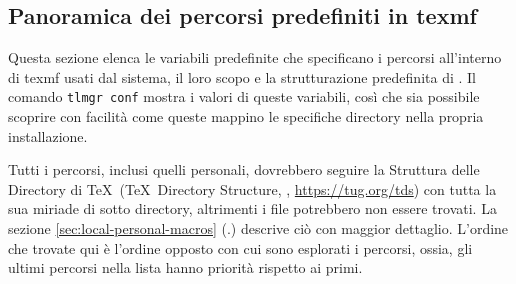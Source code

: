 \documentclass{article}
\begin{document}
\subsection{Panoramica dei percorsi predefiniti in texmf}
\label{sec:texmftrees}

Questa sezione elenca le variabili predefinite che specificano i percorsi
all'interno di texmf usati dal sistema, il loro scopo e la strutturazione
predefinita di \TL{}. Il comando \texttt{tlmgr~conf} mostra i valori di
queste variabili, così che sia possibile scoprire con facilità come queste
mappino le specifiche directory nella propria installazione.

Tutti i percorsi, inclusi quelli personali, dovrebbero seguire la Struttura
delle Directory di \TeX\ (\TeX\ Directory Structure, \TDS,
\url{https://tug.org/tds}) con tutta la sua miriade di sotto directory,
altrimenti i file potrebbero non essere trovati. La sezione
\ref{sec:local-personal-macros} (\p.\pageref{sec:local-personal-macros})
descrive ciò con maggior dettaglio. L'ordine che trovate qui è l'ordine
opposto con cui sono esplorati i percorsi, ossia, gli ultimi percorsi
nella lista hanno priorità rispetto ai primi.
\end{document}
